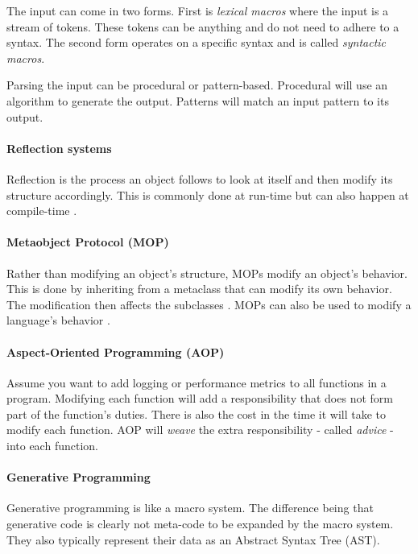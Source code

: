 The input can come in two forms.
First is \textit{lexical macros} where the input is a stream of tokens.
These tokens can be anything and do not need to adhere to a syntax.
The second form operates on a specific syntax and is called \textit{syntactic macros}.

Parsing the input can be procedural or pattern-based.
Procedural will use an algorithm to generate the output.
Patterns will match an input pattern to its output.

\paragraph{Reflection systems}
Reflection is the process an object follows to look at itself and then modify its structure accordingly.
This is commonly done at run-time but can also happen at compile-time \cite{savidis_19_01}.

\paragraph{Metaobject Protocol (MOP)}
Rather than modifying an object's structure, MOPs modify an object's behavior.
This is done by inheriting from a metaclass that can modify its own behavior.
The modification then affects the subclasses \cite{lee_95_01, savidis_19_01}.
MOPs can also be used to modify a language's behavior \cite{seaton_15_01}.

\paragraph{Aspect-Oriented Programming (AOP)}
Assume you want to add logging or performance metrics to all functions in a program.
Modifying each function will add a responsibility that does not form part of the function's duties.
There is also the cost in the time it will take to modify each function.
AOP will \textit{weave} the extra responsibility - called \textit{advice} - into each function. \cite{savidis_19_01}

\paragraph{Generative Programming}
Generative programming is like a macro system.
The difference being that generative code is clearly not meta-code to be expanded by the macro system.
They also typically represent their data as an Abstract Syntax Tree (AST). \cite{savidis_19_01}

